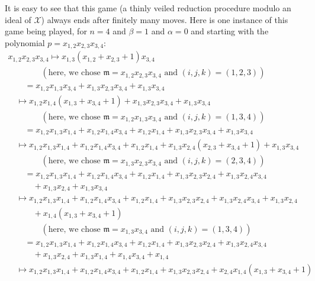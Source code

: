 \documentclass[pdftex]{sigma}
\numberwithin{equation}{section}
\begin{document}
\begin{Example}
It is easy to see that this game (a thinly veiled reduction procedure modulo an ideal of $\mathcal{X}$) always ends after finitely many moves. Here is one instance of this game being played, for $n=4$ and $\beta=1$ and $\alpha=0$ and starting with the polynomial $p=x_{1,2}x_{2,3}x_{3,4}$:
\begin{gather}
 x_{1,2}x_{2,3}x_{3,4} \mapsto x_{1,3}\left( x_{1,2}+x_{2,3}+1\right) x_{3,4}\nonumber\\
 \qquad\qquad ( \text{here, we chose }\mathfrak{m} =x_{1,2}x_{2,3}x_{3,4}\text{ and }(i,j,k) =( 1,2,3)) \nonumber\\
 \qquad{} =x_{1,2}x_{1,3}x_{3,4}+x_{1,3}x_{2,3}x_{3,4}+x_{1,3}x_{3,4}\nonumber\\
 \quad{} \mapsto x_{1,2}x_{1,4}( x_{1,3}+x_{3,4}+1) +x_{1,3}x_{2,3}x_{3,4}+x_{1,3}x_{3,4}\nonumber\\
\qquad\qquad ( \text{here, we chose }\mathfrak{m}=x_{1,2}x_{1,3}x_{3,4}\text{ and }(i,j,k) =( 1,3,4)) \nonumber\\
 \qquad{} =x_{1,2}x_{1,3}x_{1,4}+x_{1,2}x_{1,4}x_{3,4}+x_{1,2}x_{1,4}+x_{1,3}x_{2,3}x_{3,4}+x_{1,3}x_{3,4}\nonumber\\
 \quad{} \mapsto x_{1,2}x_{1,3}x_{1,4}+x_{1,2}x_{1,4}x_{3,4}+x_{1,2}x_{1,4}+x_{1,3}x_{2,4}( x_{2,3}+x_{3,4}+1) +x_{1,3}x_{3,4}\nonumber\\
\qquad\qquad (\text{here, we chose }\mathfrak{m}=x_{1,3}x_{2,3}x_{3,4}\text{ and }(i,j,k) =( 2,3,4)) \nonumber\\
 \qquad{} =x_{1,2}x_{1,3}x_{1,4}+x_{1,2}x_{1,4}x_{3,4}+x_{1,2}x_{1,4}+x_{1,3} x_{2,3}x_{2,4}+x_{1,3}x_{2,4}x_{3,4}\nonumber\\
 \qquad\quad{} +x_{1,3}x_{2,4} +x_{1,3}x_{3,4}\nonumber\\
 \quad{} \mapsto x_{1,2}x_{1,3}x_{1,4}+x_{1,2}x_{1,4}x_{3,4}+x_{1,2}x_{1,4} +x_{1,3}x_{2,3}x_{2,4}+x_{1,3}x_{2,4}x_{3,4}+x_{1,3}x_{2,4}\nonumber\\
\qquad\quad{} +x_{1,4} ( x_{1,3}+x_{3,4}+1 ) \nonumber\\
\qquad\qquad ( \text{here, we chose }\mathfrak{m}=x_{1,3}x_{3,4}\text{ and }(i,j,k) =( 1,3,4)) \nonumber\\
 \qquad{} =x_{1,2}x_{1,3}x_{1,4}+x_{1,2}x_{1,4}x_{3,4}+x_{1,2}x_{1,4}+x_{1,3}x_{2,3}x_{2,4}+x_{1,3}x_{2,4}x_{3,4}\nonumber\\
\qquad\quad{} +x_{1,3}x_{2,4}+x_{1,3}x_{1,4}+x_{1,4}x_{3,4}+x_{1,4}\nonumber\\
 \quad{} \mapsto x_{1,2}x_{1,3}x_{1,4}+x_{1,2}x_{1,4}x_{3,4}+x_{1,2}x_{1,4}+x_{1,3}x_{2,3}x_{2,4}+x_{2,4}x_{1,4} ( x_{1,3}+x_{3,4}+1 )\nonumber\\

\end{gather}
\end{Example}
\end{document}
